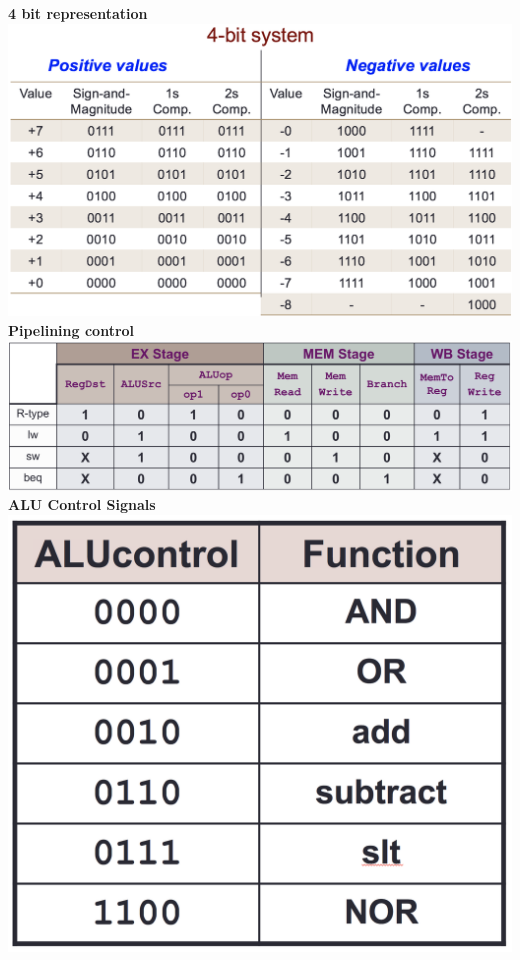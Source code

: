 \documentclass[a4paper]{article} \usepackage[backend=biber, style=numeric, sorting=none]{biblatex}
\begin{document}
\begin{multicols*}{4}
\vfill\null
\columnbreak
{\small\textbf{4 bit representation}}
\\\includegraphics[width=\columnwidth]{fourBitRepresentation}\\

{\small\textbf{Pipelining control\\}}
\includegraphics[width=\columnwidth]{instructionControl}\\

{\small\textbf{ALU Control Signals\\}}
\includegraphics[scale=0.13]{ALUControl}\\


\end{multicols*}
\end{document}
